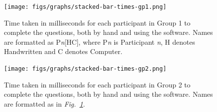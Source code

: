 \documentclass[12pt,twoside,notitlepage,xetex]{report}
\begin{document}
{%
%
\begin{center}
\begin{figure}[H]
\begin{center}
\texttt{[image: figs/graphs/stacked-bar-times-gp1.png]}
\end{center}
\caption{Time taken in milliseconds for each participant in Group 1 to complete the questions, both by hand and using the software.  Names are formatted as P\emph{n}[HC], where P\emph{n} is Participant \emph{n}, H denotes Handwritten and C denotes Computer.}
\label{fig:StacksGp1}
\end{figure}
\end{center}

\begin{center}
\begin{figure}[H]
\begin{center}
\texttt{[image: figs/graphs/stacked-bar-times-gp2.png]}
\end{center}
\caption{Time taken in milliseconds for each participant in Group 2 to complete the questions, both by hand and using the software.  Names are formatted as in \emph{Fig.~\ref{fig:StacksGp1}}.}
\label{fig:StacksGp2}
\end{figure}
\end{center}

}
\end{document}
